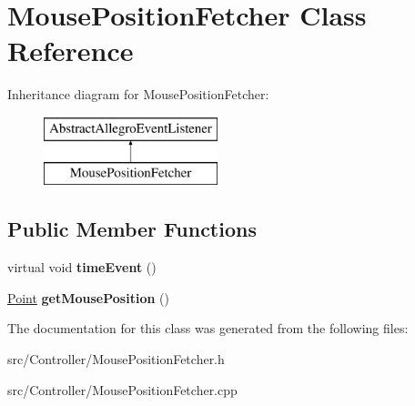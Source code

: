 \hypertarget{classMousePositionFetcher}{}\section{Mouse\+Position\+Fetcher Class Reference}
\label{classMousePositionFetcher}
Inheritance diagram for Mouse\+Position\+Fetcher\+:\begin{figure}[H]
\begin{center}
\leavevmode
\includegraphics[height=2.000000cm]{classMousePositionFetcher}
\end{center}
\end{figure}
\subsection*{Public Member Functions}
\begin{DoxyCompactItemize}
\item 
virtual void {\bfseries time\+Event} ()\hypertarget{classMousePositionFetcher_ab98bc031a7ed02ead009bd4d5dac9e67}{}\label{classMousePositionFetcher_ab98bc031a7ed02ead009bd4d5dac9e67}

\item 
\hyperlink{classPoint}{Point} {\bfseries get\+Mouse\+Position} ()\hypertarget{classMousePositionFetcher_a730fa51423d7039f4ddba250617fccfc}{}\label{classMousePositionFetcher_a730fa51423d7039f4ddba250617fccfc}

\end{DoxyCompactItemize}


The documentation for this class was generated from the following files\+:\begin{DoxyCompactItemize}
\item 
src/\+Controller/Mouse\+Position\+Fetcher.\+h\item 
src/\+Controller/Mouse\+Position\+Fetcher.\+cpp\end{DoxyCompactItemize}
